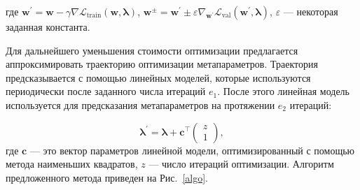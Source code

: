 \documentclass[12pt]{a&t}
\begin{document}
\noindent
где $\mathbf{w}^\prime = \mathbf{w} - \gamma\nabla\mathcal{L}_\text{train}(\mathbf{w}, \boldsymbol{\lambda})$, $\mathbf{w}^\pm = \mathbf{w}^\prime \pm \varepsilon \nabla_{\mathbf{w}^\prime}\mathcal{L}_\text{val}(\mathbf{w}^\prime, \boldsymbol{\lambda})$, $\varepsilon$ --- некоторая заданная константа.

Для дальнейшего уменьшения стоимости оптимизации предлагается аппроксимировать траекторию оптимизации метапараметров. Траектория предсказывается с помощью линейных моделей, которые используются периодически после заданного числа итераций $e_1$. После этого линейная модель используется для предсказания метапараметров на протяжении $e_2$ итераций:

\begin{equation}
     \boldsymbol{\lambda}^\prime = 
     \boldsymbol{\lambda} + \mathbf{c}^{\top}\begin{pmatrix}z\\1\end{pmatrix},
     \label{eq:linear}
\end{equation}
где $\mathbf{c}$ --- это вектор параметров линейной модели, оптимизированный с помощью метода наименьших квадратов, $z$ --- число итераций оптимизации. Алгоритм предложенного метода приведен на Рис.~\ref{algo}.








\end{document}
